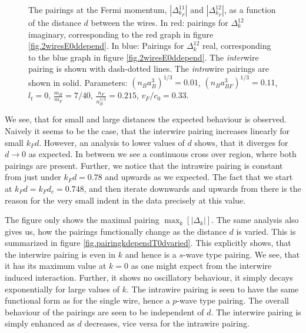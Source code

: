\begin{figure} 
\begin{center}  
  
\caption{The pairings at the Fermi momentum, $\left|\Delta^{11}_{k_F}\right|$ and $\left|\Delta^{12}_{k_F}\right|$, as a function of the distance $d$ between the wires. In red: pairings for $\Delta^{12}_k$ imaginary, corresponding to the red graph in figure \ref{fig.2wiresE0ddepend}. In blue: Pairings for $\Delta^{12}_k$ real, corresponding to the blue graph in figure \ref{fig.2wiresE0ddepend}. The \textit{inter}wire pairing is shown with dash-dotted lines. The \textit{intra}wire pairings are shown in solid. Parameters: $(n_Ba_B^3)^{1/3} = 0.01$, $(n_Ba_{BF}^3)^{1/3} = 0.11$, $l_t = 0$, $\frac{m_B}{m_F} = 7/40$, $\frac{n_F}{n_B^{1/3}} = 0.215$, $v_F/c_0 = 0.33$. }  
\label{fig.2wiresMaximalPairingddepend}  
\end{center}    
\end{figure}
 
We see, that for small and large distances the expected behaviour is observed. Naively it seems to be the case, that the interwire pairing increases linearly for small $k_Fd$. However, an analysis to lower values of $d$ shows, that it diverges for $d \to 0$ as expected. In between we see a continuous cross over region, where both pairings are present. Further, we notice that the intrawire pairing is constant from just under $k_Fd = 0.78$ and upwards as we expected. The fact that we start at $k_Fd = k_Fd_c = 0.748$, and then iterate downwards and upwards from there is the reason for the very small indent in the data precisely at this value.

The figure only shows the maximal pairing $\max_k[|\Delta_k|]$. The same analysis also gives us, how the pairings functionally change as the distance $d$ is varied. This is summarized in figure \ref{fig.pairingkdependT0dvaried}. This explicitly shows, that the interwire pairing is even in $k$ and hence is a $s$-wave type pairing. We see, that it has its maximum value at $k=0$ as one might expect from the interwire induced interaction. Further, it shows no oscillatory behaviour, it simply decays exponentially for large values of $k$. The intrawire pairing is seen to have the same functional form as for the single wire, hence a $p$-wave type pairing. The overall behaviour of the pairings are seen to be independent of $d$. The interwire pairing is simply enhanced as $d$ decreases, vice versa for the intrawire pairing.  

